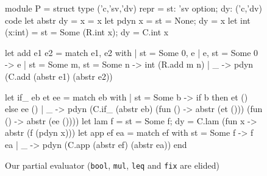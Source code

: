 \begin{comment}
\begin{figure*}
\begin{floatrule}
\begin{code}
module type Symantics = sig
  type ('c,'sv,'dv) repr

  val int : int  -> ('c,int,int) repr
  val bool: bool -> ('c,bool,bool) repr

  val lam : (('c,'sa,'da) repr -> ('c,'sb,'db) repr as 'x) -> ('c,'x,'da->'db) repr
  val app : ('c,'x,'da->'db) repr -> (('c,'sa,'da) repr -> ('c,'sb,'db) repr as 'x)
  val fix : ('x -> 'x) -> (('c, ('c,'sa,'da) repr -> ('c,'sb,'db) repr, 'da->'db) repr as 'x)

  val add : ('c,int,int) repr -> ('c,int,int) repr -> ('c,int,int) repr
  val mul : ('c,int,int) repr -> ('c,int,int) repr -> ('c,int,int) repr
  val leq : ('c,int,int) repr -> ('c,int,int) repr -> ('c,bool,bool) repr
  val if_ : ('c,bool,bool) repr -> (unit -> 'x) -> (unit -> 'x) -> (('c,'sa,'da) repr as 'x)
end
\end{code}
\end{floatrule}
\caption{A (Meta)OCaml embedding of our object language that supports partial evaluation}
\label{fig:ocaml}
\end{figure*}
\end{comment}

\begin{figure}
\begin{floatrule}
\begin{code}
module P = struct
  type ('c,'sv,'dv) repr = {st: 'sv option; dy: ('c,'dv) code}
  let abstr {dy = x} = x    let pdyn x = {st = None; dy = x}
  let int  (x:int)  = {st = Some (R.int x);  dy = C.int x}

  let add e1 e2 = match e1, e2 with
  | {st = Some 0}, e | e, {st = Some 0} -> e
  | {st = Some m}, {st = Some n} -> int (R.add m n)
  | _ -> pdyn (C.add (abstr e1) (abstr e2))

  let if_ eb et ee = match eb with
  | {st = Some b} -> if b then et () else ee ()
  | _ -> pdyn (C.if_ (abstr eb) (fun () -> abstr (et ()))
                                (fun () -> abstr (ee ())))
  let lam f = {st = Some f; dy = C.lam (fun x -> abstr (f (pdyn x)))}
  let app ef ea = match ef with {st = Some f} -> f ea
                  | _ -> pdyn (C.app (abstr ef) (abstr ea)) end
\end{code}
\end{floatrule}
\caption{Our partial evaluator (\texttt{bool}, \texttt{mul},
  \texttt{leq} and \texttt{fix} are elided)}
\label{fig:pe}
\end{figure}

